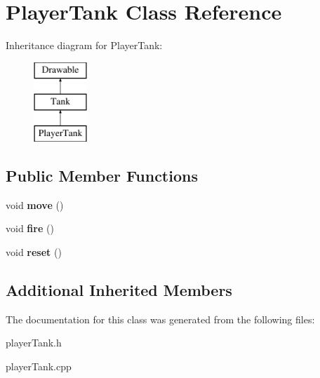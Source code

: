 \hypertarget{class_player_tank}{}\section{Player\+Tank Class Reference}
\label{class_player_tank}
Inheritance diagram for Player\+Tank\+:\begin{figure}[H]
\begin{center}
\leavevmode
\includegraphics[height=3.000000cm]{class_player_tank}
\end{center}
\end{figure}
\subsection*{Public Member Functions}
\begin{DoxyCompactItemize}
\item 
\mbox{\label{class_player_tank_af093b3eb3e479306eff7dd744c733c01}} 
void {\bfseries move} ()
\item 
\mbox{\label{class_player_tank_ab5472bbce0ed243597b93e349889df27}} 
void {\bfseries fire} ()
\item 
\mbox{\label{class_player_tank_a0cb62beee428d7b3e61a2670b6bf8f4c}} 
void {\bfseries reset} ()
\end{DoxyCompactItemize}
\subsection*{Additional Inherited Members}


The documentation for this class was generated from the following files\+:\begin{DoxyCompactItemize}
\item 
player\+Tank.\+h\item 
player\+Tank.\+cpp\end{DoxyCompactItemize}
